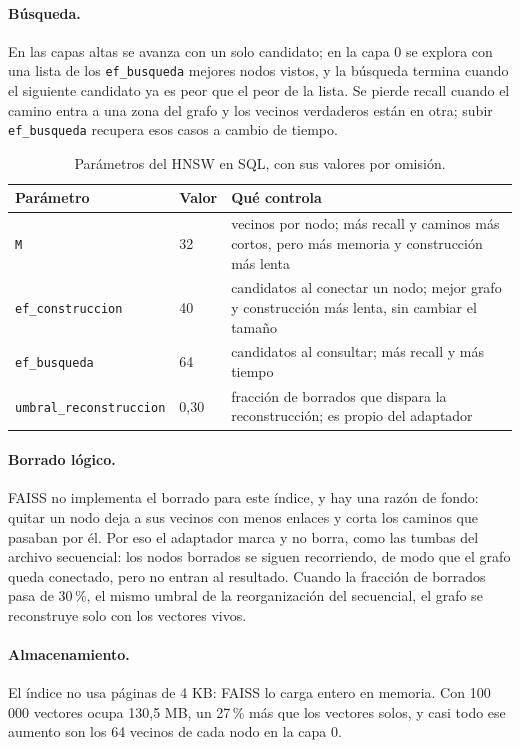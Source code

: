 \documentclass[11pt,a4paper]{article}
\begin{document}
\paragraph{Búsqueda.} En las capas altas se avanza con un solo candidato; en la capa 0 se explora con una lista de los \texttt{ef\_busqueda} mejores nodos vistos, y la búsqueda termina cuando el siguiente candidato ya es peor que el peor de la lista. Se pierde recall cuando el camino entra a una zona del grafo y los vecinos verdaderos están en otra; subir \texttt{ef\_busqueda} recupera esos casos a cambio de tiempo.

\begin{table}[H]
\centering
\small
\begin{tabular}{p{3.6cm}p{1.2cm}p{9.4cm}}
\toprule
Parámetro & Valor & Qué controla \\
\midrule
\texttt{M} & 32 & vecinos por nodo; más recall y caminos más cortos, pero más memoria y construcción más lenta \\
\texttt{ef\_construccion} & 40 & candidatos al conectar un nodo; mejor grafo y construcción más lenta, sin cambiar el tamaño \\
\texttt{ef\_busqueda} & 64 & candidatos al consultar; más recall y más tiempo \\
\texttt{umbral\_reconstruccion} & 0,30 & fracción de borrados que dispara la reconstrucción; es propio del adaptador \\
\bottomrule
\end{tabular}
\caption{Parámetros del HNSW en SQL, con sus valores por omisión.}
\end{table}

\paragraph{Borrado lógico.} FAISS no implementa el borrado para este índice, y hay una razón de fondo: quitar un nodo deja a sus vecinos con menos enlaces y corta los caminos que pasaban por él. Por eso el adaptador marca y no borra, como las tumbas del archivo secuencial: los nodos borrados se siguen recorriendo, de modo que el grafo queda conectado, pero no entran al resultado. Cuando la fracción de borrados pasa de 30\,\%, el mismo umbral de la reorganización del secuencial, el grafo se reconstruye solo con los vectores vivos.

\paragraph{Almacenamiento.} El índice no usa páginas de 4 KB: FAISS lo carga entero en memoria. Con 100\,000 vectores ocupa 130,5 MB, un 27\,\% más que los vectores solos, y casi todo ese aumento son los 64 vecinos de cada nodo en la capa 0.
\end{document}
